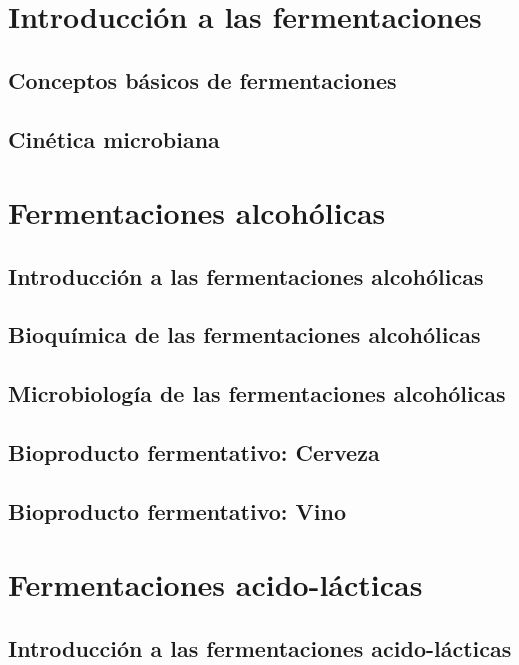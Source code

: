 \documentclass{ManualBiotecnologico}
\begin{document}
    \frontmatter

\Portada
\Indices
    
    \mainmatter

\part{Introducción a las fermentaciones}

    \chapter{Conceptos básicos de fermentaciones}
    \chapter{Cinética microbiana}

\part{Fermentaciones alcohólicas}

    \chapter{Introducción a las fermentaciones alcohólicas}
    \chapter{Bioquímica de las fermentaciones alcohólicas}
    \chapter{Microbiología de las fermentaciones alcohólicas}
    \chapter{Bioproducto fermentativo: Cerveza}
    \chapter{Bioproducto fermentativo: Vino}

\part{Fermentaciones acido-lácticas}

    \chapter{Introducción a las fermentaciones acido-lácticas}
\end{document}
